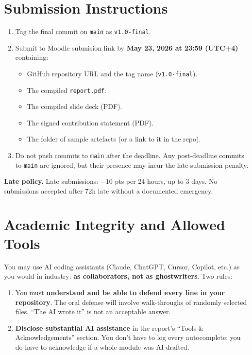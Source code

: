 \documentclass[11pt,a4paper]{article}
\newcommand{\duedate}{May 23, 2026 at 23:59 (UTC+4)}
\begin{document}
\section{Submission Instructions}
\begin{enumerate}[topsep=2pt,itemsep=2pt,leftmargin=2.2em]
  \item Tag the final commit on \texttt{main} as \texttt{v1.0-final}.
  \item Submit to Moodle submision link by \textcolor{accent2}{\textbf{\duedate}} containing:
  \begin{itemize}[topsep=1pt,itemsep=0pt]
    \item GitHub repository URL and the tag name (\texttt{v1.0-final}).
    \item The compiled \texttt{report.pdf}.
    \item The compiled slide deck (PDF).
    \item The signed contribution statement (PDF).
    \item The folder of sample artefacts (or a link to it in the repo).
  \end{itemize}
  \item Do not push commits to \texttt{main} after the deadline. Any post-deadline commits to \texttt{main} are ignored, but their presence may incur the late-submission penalty.
\end{enumerate}

\textbf{Late policy.} Late submissions: $-10$ pts per 24 hours, up to 3 days. No submissions accepted after 72h late without a documented emergency.

\section{Academic Integrity and Allowed Tools}\label{sec:integrity}
You may use AI coding assistants (Claude, ChatGPT, Cursor, Copilot, etc.) as you would in industry: \textbf{as collaborators, not as ghostwriters}. Two rules:

\begin{enumerate}[topsep=2pt,itemsep=2pt,leftmargin=2.2em]
  \item You must \textbf{understand and be able to defend every line in your repository}. The oral defense will involve walk-throughs of randomly selected files. ``The AI wrote it'' is not an acceptable answer.
  \item \textbf{Disclose substantial AI assistance} in the report's ``Tools \& Acknowledgements'' section. You don't have to log every autocomplete; you do have to acknowledge if a whole module was AI-drafted.
\end{enumerate}
\end{document}
